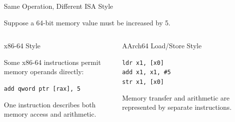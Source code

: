 \documentclass[aspectratio=169,11pt,t]{beamer}
\newcommand{\code}[1]{\texttt{#1}}
\begin{document}

\begin{frame}{Same Operation, Different ISA Style}

Suppose a 64-bit memory value
must be increased by 5.

\vspace{0.15cm}

\begin{columns}[T,onlytextwidth]


\begin{block}{x86-64 Style}

Some x86-64 instructions permit
memory operands directly:

\begin{center}

\begin{minipage}{0.9\textwidth}
\raggedright
\large
\code{add qword ptr [rax], 5}
\end{minipage}

\end{center}

One instruction describes
both memory access and arithmetic.

\end{block}


\begin{block}{AArch64 Load/Store Style}

\begin{center}

\begin{minipage}{0.62\textwidth}
\raggedright
\large
\code{ldr x1, [x0]}\\[0.15cm]
\code{add x1, x1, \#5}\\[0.15cm]
\code{str x1, [x0]}
\end{minipage}

\end{center}

Memory transfer and arithmetic
are represented by separate instructions.

\end{block}

\end{columns}

\end{frame}
\end{document}

